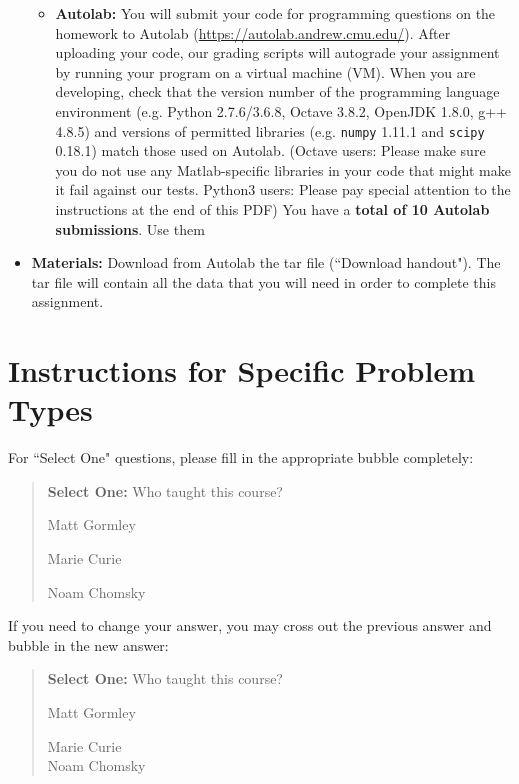 \documentclass[11pt]{article}
\numberwithin{equation}{section} %
\numberwithin{figure}{section} %
\numberwithin{table}{section} %
\begin{document}
\begin{itemize}
\begin{itemize}
  \item \textbf{Autolab:} You will submit your code for programming
    questions on the homework to Autolab
    (\url{https://autolab.andrew.cmu.edu/}). After uploading your code,
    our grading scripts will autograde your assignment by running your
    program on a virtual machine (VM). 
    When you are developing, check that the
    version number of the programming language environment
    (e.g. Python 2.7.6/3.6.8, Octave 3.8.2, OpenJDK 1.8.0, g++ 4.8.5) and
    versions of permitted libraries (e.g.  \texttt{numpy} 1.11.1 and \texttt{scipy} 0.18.1) 
    match those used on Autolab.
    (Octave users: Please make sure you do not use any
    Matlab-specific libraries in your code that might make it fail
    against our tests. Python3 users: Please pay special attention to the instructions at the end of this PDF)
    You have a {\bf total of 10 Autolab submissions}. Use them

  \end{itemize}
  
\item\textbf{Materials:} Download from Autolab the tar file (``Download
  handout"). The tar file will contain all the data that you will need in order to complete this assignment.

\end{itemize}

\clearpage
\section*{Instructions for Specific Problem Types}

For ``Select One" questions, please fill in the appropriate bubble completely:

\begin{quote}
\textbf{Select One:} Who taught this course?
\begin{list}{}
     \item\CIRCLE{} Matt Gormley
     \item\Circle{} Marie Curie
     \item\Circle{} Noam Chomsky
\end{list}
\end{quote}

If you need to change your answer, you may cross out the previous answer and bubble in the new answer:

\begin{quote}
\textbf{Select One:} Who taught this course?
\begin{list}{}
     \item\CIRCLE{} Matt Gormley
     \item\Circle{} Marie Curie\\
     \xcancel{\CIRCLE}{} Noam Chomsky
\end{list}
\end{quote}
\end{document}
